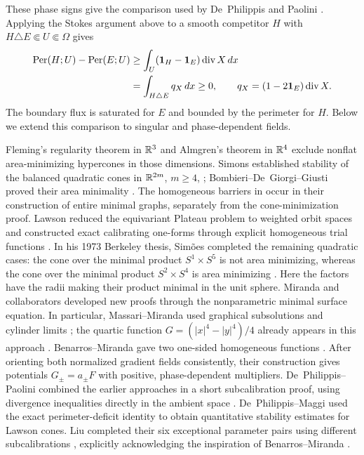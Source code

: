 These phase signs give the comparison used by De~Philippis and Paolini
\cite{DePhilippisPaolini}. Applying the Stokes argument above to a smooth
competitor \(H\) with \(H\triangle E\Subset U\Subset\Omega\) gives
\begin{align}
 \operatorname{Per}(H;U)-\operatorname{Per}(E;U)
 &\geq\int_U(\mathbf 1_H-\mathbf 1_E)\operatorname{div} X\,dx\notag\\
 &=\int_{H\triangle E}q_X\,dx\geq0,
 \qquad q_X=(1-2\mathbf 1_E)\operatorname{div} X.
 \label{eq:smooth-subcalibration-Stokes}
\end{align}
The boundary flux is saturated for \(E\) and bounded by the perimeter
for \(H\). Below we extend this comparison to singular and
phase-dependent fields.

\begin{remark}
\label{rem:subcalibration-history}
Fleming's regularity theorem in $\mathbb R^3$ \cite{Fleming62} and
Almgren's theorem in $\mathbb R^4$ \cite{Almgren66} exclude nonflat
area-minimizing hypercones in those dimensions.
Simons established stability of the balanced quadratic cones in
\(\mathbb R^{2m}\), \(m\geq4\), \cite{Simons68}; Bombieri--De~Giorgi--Giusti
proved their area minimality \cite[Sections~II--III]{BDGG69}.
The homogeneous barriers in \cite[Section~IV, p.~260]{BDGG69}
occur in their construction of entire minimal graphs, separately from
the cone-minimization proof. Lawson reduced the equivariant Plateau
problem to weighted orbit spaces and constructed exact calibrating
one-forms through explicit homogeneous trial functions
\cite[Section~5, pp.~244--247]{Lawson72}.
In his 1973 Berkeley thesis, Sim\~oes completed the remaining
quadratic cases: the cone over the minimal product
$S^1\times S^5$ is not area minimizing, whereas the cone over
the minimal product $S^2\times S^4$ is area minimizing
\cite{Simoes73}. Here the factors have the radii making their
product minimal in the unit sphere.
Miranda and collaborators developed new proofs through the
nonparametric minimal surface equation. In particular,
Massari--Miranda used graphical subsolutions and cylinder limits
\cite{MassariMiranda83}; the quartic function
\(G=(|x|^4-|y|^4)/4\) already appears in this approach
\cite[pp.~146--147]{Miranda08}.
Benarros--Miranda gave two one-sided homogeneous functions
\cite[Section~2, pp.~46--47]{BenarrosMiranda95}.
After orienting both normalized gradient fields consistently, their
construction gives potentials \(G_\pm=a_\pm F\) with positive,
phase-dependent multipliers.
De~Philippis--Paolini combined the earlier approaches in a short
subcalibration proof, using divergence inequalities directly in the
ambient space \cite[pp.~234--235]{DePhilippisPaolini}.
De~Philippis--Maggi used the exact perimeter-deficit identity
\cite[Proposition~4.1, equation~(4.5)]{DePhilippisMaggi14}
to obtain quantitative stability estimates for Lawson cones.
Liu completed their six exceptional parameter pairs using different
subcalibrations \cite[Theorems~1--2 and Section~2.1]{Liu19},
explicitly acknowledging the inspiration of Benarros--Miranda
\cite[p.~1002]{Liu19}.
\end{remark}

